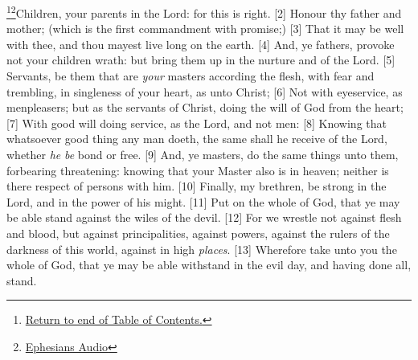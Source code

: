 \footnote{\textcolor[cmyk]{0.99998,1,0,0}{\hyperlink{TOC}{Return to end of Table of Contents.}}}\footnote{\href{https://www.audioverse.org/english/audiobibles/books/ENGKJV/N/Eph/1}{\textcolor[cmyk]{0.99998,1,0,0}{Ephesians Audio}}}\textcolor[cmyk]{0.99998,1,0,0}{Children,  your parents in the Lord: for this is right.}
[2] \textcolor[cmyk]{0.99998,1,0,0}{Honour thy father and mother; (which is the first commandment with promise;)}
[3] \textcolor[cmyk]{0.99998,1,0,0}{That it may be well with thee, and thou mayest live long on the earth.}
[4] \textcolor[cmyk]{0.99998,1,0,0}{And, ye fathers, provoke not your children  wrath: but bring them up in the nurture and  of the Lord.}
[5] \textcolor[cmyk]{0.99998,1,0,0}{Servants, be   them that are \emph{your} masters according  the flesh, with fear and trembling, in singleness of your heart, as unto Christ;}
[6] \textcolor[cmyk]{0.99998,1,0,0}{Not with eyeservice, as menpleasers; but as the servants of Christ, doing the will of God from the heart;}
[7] \textcolor[cmyk]{0.99998,1,0,0}{With good will doing service, as  the Lord, and not  men:}
[8] \textcolor[cmyk]{0.99998,1,0,0}{Knowing that whatsoever good thing any man doeth, the same shall he receive of the Lord, whether \emph{he} \emph{be} bond or free.}
[9] \textcolor[cmyk]{0.99998,1,0,0}{And, ye masters, do the same things unto them, forbearing threatening: knowing that your Master also is in heaven; neither is there respect of persons with him.}
[10] \textcolor[cmyk]{0.99998,1,0,0}{Finally, my brethren, be strong in the Lord, and in the power of his might.}
[11] \textcolor[cmyk]{0.99998,1,0,0}{Put on the whole  of God, that ye may be able  stand against the wiles of the devil.}
[12] \textcolor[cmyk]{0.99998,1,0,0}{For we wrestle not against flesh and blood, but against principalities, against powers, against the rulers of the darkness of this world, against  in high \emph{places}.}
[13] \textcolor[cmyk]{0.99998,1,0,0}{Wherefore take unto you the whole  of God, that ye may be able  withstand in the evil day, and having done all,  stand.}
